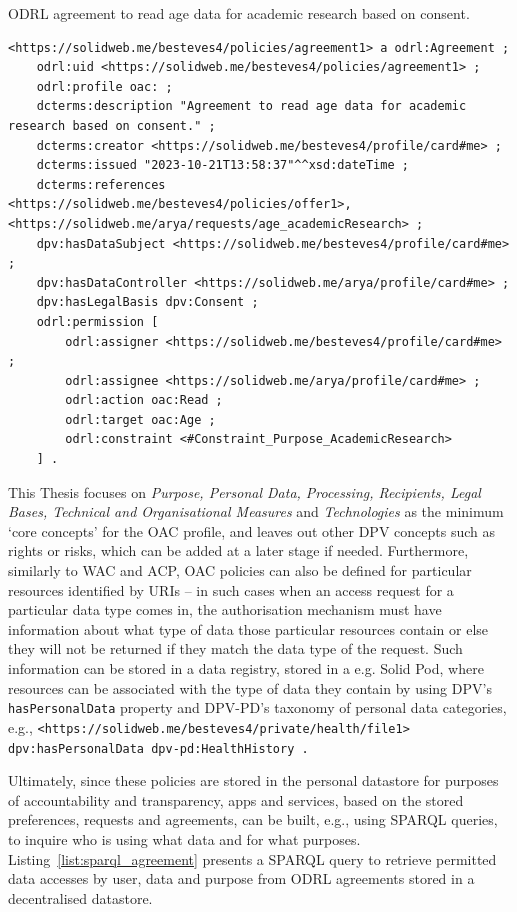 \begin{listing}[ht]
\caption{ODRL agreement to read age data for academic research based on consent.}
\label{list:oac_agreement}
\begin{verbatim}
<https://solidweb.me/besteves4/policies/agreement1> a odrl:Agreement ;
    odrl:uid <https://solidweb.me/besteves4/policies/agreement1> ;
    odrl:profile oac: ;
    dcterms:description "Agreement to read age data for academic research based on consent." ;
    dcterms:creator <https://solidweb.me/besteves4/profile/card#me> ;
    dcterms:issued "2023-10-21T13:58:37"^^xsd:dateTime ;
    dcterms:references <https://solidweb.me/besteves4/policies/offer1>, <https://solidweb.me/arya/requests/age_academicResearch> ;
    dpv:hasDataSubject <https://solidweb.me/besteves4/profile/card#me> ;
    dpv:hasDataController <https://solidweb.me/arya/profile/card#me> ;
    dpv:hasLegalBasis dpv:Consent ;
    odrl:permission [
        odrl:assigner <https://solidweb.me/besteves4/profile/card#me> ;
        odrl:assignee <https://solidweb.me/arya/profile/card#me> ;
        odrl:action oac:Read ;
        odrl:target oac:Age ;
        odrl:constraint <#Constraint_Purpose_AcademicResearch>
    ] .
\end{verbatim}
\end{listing}

This Thesis focuses on \textit{Purpose, Personal Data, Processing, Recipients, Legal Bases, Technical and Organisational Measures} and \textit{Technologies} as the minimum `core concepts' for the OAC profile, and leaves out other DPV concepts such as rights or risks, which can be added at a later stage if needed.
Furthermore, similarly to WAC and ACP, OAC policies can also be defined for particular resources identified by URIs -- in such cases when an access request for a particular data type comes in, the authorisation mechanism must have information about what type of data those particular resources contain or else they will not be returned if they match the data type of the request.
Such information can be stored in a data registry, stored in a e.g. Solid Pod, where resources can be associated with the type of data they contain by using DPV's \texttt{hasPersonalData} property and DPV-PD's taxonomy of personal data categories, e.g., \texttt{<https://solidweb.me/besteves4/private/health/file1> dpv:hasPersonalData dpv-pd:HealthHistory .}

Ultimately, since these policies are stored in the personal datastore for purposes of accountability and transparency, apps and services, based on the stored preferences, requests and agreements, can be built, e.g., using SPARQL queries, to inquire who is using what data and for what purposes.
Listing~\ref{list:sparql_agreement} presents a SPARQL query to retrieve permitted data accesses by user, data and purpose from ODRL agreements stored in a decentralised datastore.

